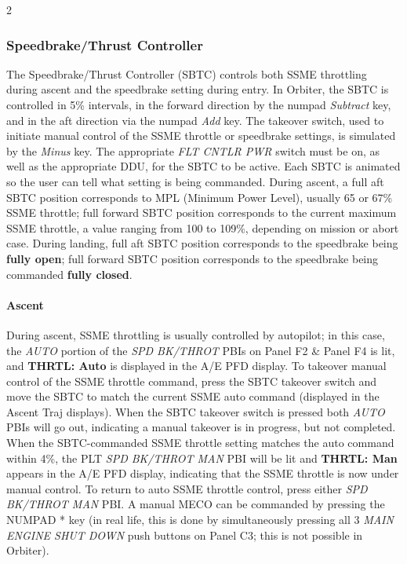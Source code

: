 \documentclass[Space_Shuttle_Vessel_Manual.tex]{subfiles}
\begin{document}
\begin{multicols*}{2}
\subsubsection{Speedbrake/Thrust Controller}
The Speedbrake/Thrust Controller (SBTC) controls both SSME throttling during ascent and the speedbrake setting during entry. In Orbiter, the SBTC is controlled in 5\% intervals, in the forward direction by the numpad \textit{Subtract} key, and in the aft direction via the numpad \textit{Add} key. The takeover switch, used to initiate manual control of the SSME throttle or speedbrake settings, is simulated by the \textit{Minus} key. The appropriate \textit{FLT CNTLR PWR} switch must be on, as well as the appropriate DDU, for the SBTC to be active. Each SBTC is animated so the user can tell what setting is being commanded. During ascent, a full aft SBTC position corresponds to MPL (Minimum Power Level), usually 65 or 67\% SSME throttle; full forward SBTC position corresponds to the current maximum SSME throttle, a value ranging from 100 to 109\%, depending on mission or abort case. During landing, full aft SBTC position corresponds to the speedbrake being \textbf{fully open}; full forward SBTC position corresponds to the speedbrake being commanded \textbf{fully closed}.

\paragraph{Ascent}
During ascent, SSME throttling is usually controlled by autopilot; in this case, the \textit{AUTO} portion of the \textit{SPD BK/THROT} PBIs on Panel F2 \& Panel F4 is lit, and \textbf{THRTL: Auto} is displayed in the A/E PFD display. To takeover manual control of the SSME throttle command, press the SBTC takeover switch and move the SBTC to match the current SSME auto command (displayed in the Ascent Traj displays). When the SBTC takeover switch is pressed both \textit{AUTO} PBIs will go out, indicating a manual takeover is in progress, but not completed. When the SBTC-commanded SSME throttle setting matches the auto command within 4\%, the PLT \textit{SPD BK/THROT MAN} PBI will be lit and \textbf{THRTL: Man} appears in the A/E PFD display, indicating that the SSME throttle is now under manual control. To return to auto SSME throttle control, press either \textit{SPD BK/THROT MAN} PBI. A manual MECO can be commanded by pressing the NUMPAD * key (in real life, this is done by simultaneously pressing all 3 \textit{MAIN ENGINE SHUT DOWN} push buttons on Panel C3; this is not possible in Orbiter).


\end{multicols*}
\end{document}
